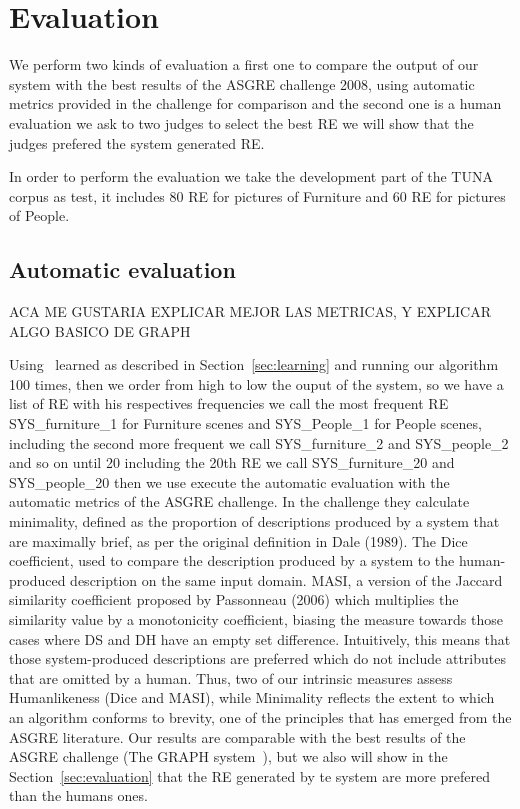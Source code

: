 \section{Evaluation} \label{sec:automaticeval}

We perform two kinds of evaluation a first one to compare the output of our system with the best results of the ASGRE challenge 2008, using automatic metrics provided in the challenge for comparison and the second one is a human evaluation we ask to two judges to select the best RE we will show that the judges prefered the system generated RE.

In order to perform the evaluation we take the development part of the TUNA corpus as test, it includes 80 RE for pictures of Furniture  and 60 RE for pictures of People.

\subsection{Automatic evaluation}

ACA ME GUSTARIA EXPLICAR MEJOR LAS METRICAS, Y EXPLICAR ALGO BASICO DE GRAPH

Using \puse~learned as described in Section~\ref{sec:learning} and running our algorithm 100 times, then we order from high to low the ouput of the system, so we have a list of RE with his respectives frequencies we call the most frequent RE SYS\_furniture\_1 for Furniture scenes and SYS\_People\_1 for People scenes, including the second more frequent we call SYS\_furniture\_2 and SYS\_people\_2 and so on until 20 including the 20th RE we call SYS\_furniture\_20 and SYS\_people\_20 then we use execute the automatic evaluation with the automatic metrics of the ASGRE challenge. 
In the challenge they calculate minimality, defined as the proportion of descriptions produced by a system
that are maximally brief, as per the original definition in Dale (1989). The Dice coefficient, used to compare the description produced by a system to the human-produced description on the same input domain. %
MASI, a version of the Jaccard similarity coefficient proposed
by Passonneau (2006) which multiplies the similarity value by a monotonicity coefficient, biasing
the measure towards those cases where DS and
DH have an empty set difference. Intuitively, this
means that those system-produced descriptions are
preferred which do not include attributes that are
omitted by a human. Thus, two of our intrinsic measures assess Humanlikeness (Dice and MASI), while
Minimality reflects the extent to which an algorithm
conforms to brevity, one of the principles that has
emerged from the ASGRE literature.
Our results are comparable with the best results of the ASGRE challenge (The GRAPH system~\cite{KrahmerGRAPH}), but we also will show in the Section~\ref{sec:evaluation} that the RE generated by te system are more prefered than the humans ones.


